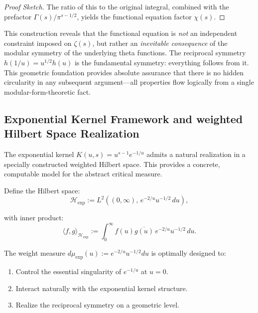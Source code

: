 \begin{theorem}
\begin{proof}[Proof Sketch]
The ratio of this to the original integral, combined with the prefactor $\Gamma(s)/\pi^{s-1/2}$, yields the functional equation factor $\chi(s)$.

\end{proof}

\end{theorem}

\begin{remark}

This construction reveals that the functional equation is \emph{not} an independent constraint imposed on $\zeta(s)$, but rather an \emph{inevitable consequence} of the modular symmetry of the underlying theta functions. The reciprocal symmetry $h(1/u) = u^{1/2}h(u)$ is the fundamental symmetry: everything follows from it. This geometric foundation provides absolute assurance that there is no hidden circularity in any subsequent argument---all properties flow logically from a single modular-form-theoretic fact.

\end{remark}

\subsection{Exponential Kernel Framework and weighted Hilbert Space Realization}
\label{subsec:exponentialKernelFramework}

The exponential kernel $K(u,s) = u^{s-1}e^{-1/u}$ admits a natural realization in a specially constructed weighted Hilbert space. This provides a concrete, computable model for the abstract critical measure.

\begin{definition}
\label{def:expWeightHilbertSpace}

Define the Hilbert space:
\begin{equation}
\mathcal{H}_{\mathrm{exp}} := L^2\left((0,\infty), \, e^{-2/u} u^{-1/2} \, du\right),
\end{equation}

with inner product:
\begin{equation}
\langle f, g \rangle_{\mathcal{H}_{\mathrm{exp}}} := \int_0^{\infty} f(u)\overline{g(u)} \, e^{-2/u} u^{-1/2} \, du.
\end{equation}

The weight measure $d\mu_{\mathrm{exp}}(u) := e^{-2/u} u^{-1/2} du$ is optimally designed to:
\begin{enumerate}
\item Control the essential singularity of $e^{-1/u}$ at $u = 0$.
\item Interact naturally with the exponential kernel structure.
\item Realize the reciprocal symmetry on a geometric level.
\end{enumerate}

\end{definition}

